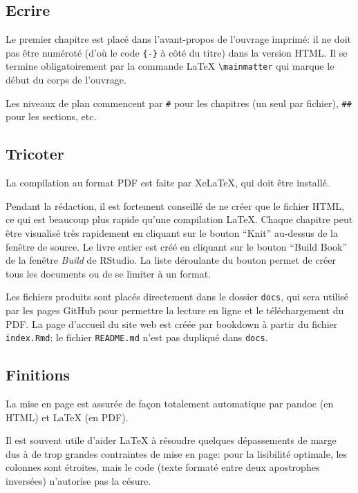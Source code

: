 \documentclass[
  12pt,
  french,
  a4paper,
  extrafontsizes,onecolumn,openright
  ]{memoir}
\begin{document}
\hypertarget{ecrire-2}{%
\subsection{Ecrire}\label{ecrire-2}}

Le premier chapitre est placé dans l'avant-propos de l'ouvrage imprimé: il ne doit pas être numéroté (d'où le code \texttt{\{-\}} à côté du titre) dans la version HTML.
Il se termine obligatoirement par la commande LaTeX \texttt{\textbackslash{}mainmatter} qui marque le début du corps de l'ouvrage.

Les niveaux de plan commencent par \texttt{\#} pour les chapitres (un seul par fichier), \texttt{\#\#} pour les sections, etc.

\hypertarget{tricoter-1}{%
\subsection{Tricoter}\label{tricoter-1}}

La compilation au format PDF est faite par XeLaTeX, qui doit être installé.

Pendant la rédaction, il est fortement conseillé de ne créer que le fichier HTML, ce qui est beaucoup plus rapide qu'une compilation LaTeX.
Chaque chapitre peut être visualisé très rapidement en cliquant sur le bouton \enquote{Knit} au-dessus de la fenêtre de source.
Le livre entier est créé en cliquant sur le bouton \enquote{Build Book} de la fenêtre \emph{Build} de RStudio.
La liste déroulante du bouton permet de créer tous les documents ou de se limiter à un format.

Les fichiers produits sont placés directement dans le dossier \texttt{docs}, qui sera utilisé par les pages GitHub pour permettre la lecture en ligne et le téléchargement du PDF.
La page d'accueil du site web est créée par bookdown à partir du fichier \texttt{index.Rmd}: le fichier \texttt{README.md} n'est pas dupliqué dans \texttt{docs}.

\hypertarget{finitions}{%
\subsection{Finitions}\label{finitions}}

La mise en page est assurée de façon totalement automatique par pandoc (en HTML) et LaTeX (en PDF).

Il est souvent utile d'aider LaTeX à résoudre quelques dépassements de marge dus à de trop grandes contraintes de mise en page: pour la lisibilité optimale, les colonnes sont étroites, mais le code (texte formaté entre deux apostrophes inversées) n'autorise pas la césure.
\end{document}
